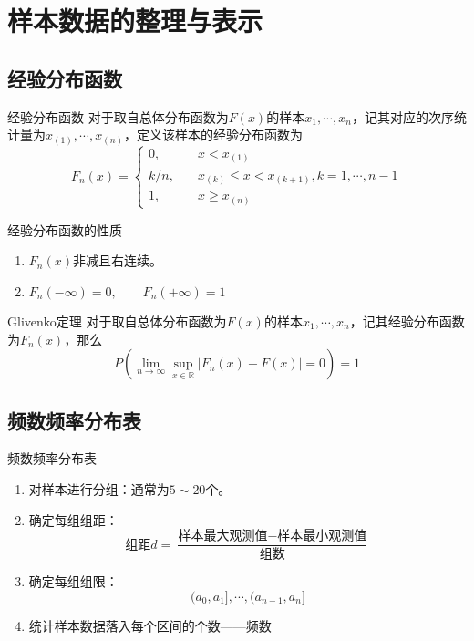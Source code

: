 \documentclass[lang = cn, scheme = chinese, thmcnt = section]{elegantbook}
\newcommand{\R}{\mathbb{R}}            %
\begin{document}
\section{样本数据的整理与表示}

\subsection{经验分布函数}

\begin{definition}{经验分布函数}
	对于取自总体分布函数为$F(x)$的样本$x_1,\cdots,x_n$，记其对应的次序统计量为$x_{(1)},\cdots,x_{(n)}$，定义该样本的经验分布函数为
	$$
	F_n(x)=\begin{cases}
		0,&\quad x<x_{(1)}\\
		k/n,&\quad x_{(k)}\le x<x_{(k+1)},k=1,\cdots,n-1\\
		1,&\quad x\ge x_{(n)}
	\end{cases}
	$$
\end{definition}

\begin{proposition}{经验分布函数的性质}
	\begin{enumerate}
		\item $F_n(x)$非减且右连续。
		\item $F_n(-\infty)=0,\qquad F_n(+\infty)=1$
	\end{enumerate}
\end{proposition}

\begin{theorem}{Glivenko定理}
	对于取自总体分布函数为$F(x)$的样本$x_1,\cdots,x_n$，记其经验分布函数为$F_n(x)$，那么
	$$
	P\left(\lim_{n\to\infty}\sup_{x\in\R}{|F_n(x)-F(x)|}=0\right)=1
	$$
\end{theorem}

\subsection{频数频率分布表}

\begin{definition}{频数频率分布表}
	\begin{enumerate}
		\item 对样本进行分组：通常为$5\sim 20$个。
		\item 确定每组组距：
		$$
		组距d=\frac{\text{样本最大观测值}-\text{样本最小观测值}}{\text{组数}}
		$$
		\item 确定每组组限：
		$$
		(a_0,a_1],\cdots,(a_{n-1},a_n]
		$$
		\item 统计样本数据落入每个区间的个数——频数
	\end{enumerate}
\end{definition}
\end{document}
